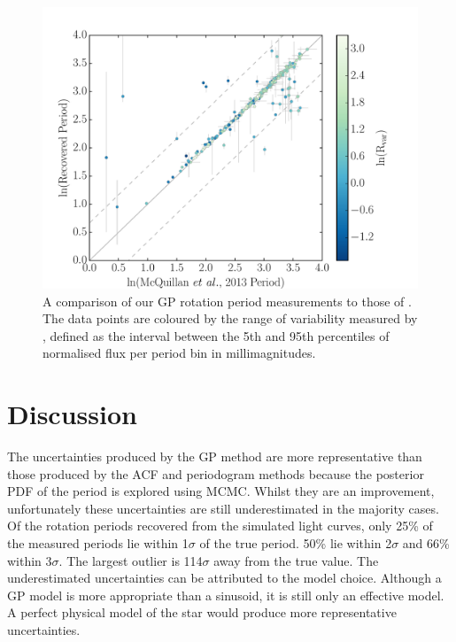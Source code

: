 \documentclass[useAMS, usenatbib, preprint, 12pt]{aastex}
\newcommand{\tdmcomment}[1]{{\color{blue}#1}}
\begin{document}
\begin{figure}
\begin{center}
\includegraphics[width=6in, clip=true]{figures/comparison_koi_02_03.pdf}
\caption[Comparison with McQuillan results.]
{A comparison of our GP rotation period measurements to those of
\citet{Mcquillan2013}.
The data points are coloured by the range of variability measured by
    \citet{Mcquillan2013}, defined as the interval between the 5th and 95th
    percentiles of normalised flux per period bin in millimagnitudes.}
\label{fig:mcquillan}
\end{center}
\end{figure}

\section{Discussion}
\label{sec:discussion}

The uncertainties produced by the GP method are more representative than those
produced by the ACF and periodogram methods because the posterior PDF of the
period is explored using MCMC.
Whilst they are an improvement, unfortunately these uncertainties are still
underestimated in the majority cases.
Of the rotation periods recovered from the simulated light curves, only 25\%
of the measured periods lie within 1$\sigma$ of the true period.
50\% lie within 2$\sigma$ and 66\% within 3$\sigma$.
The largest outlier is 114$\sigma$ away from the true value.
The underestimated uncertainties can be attributed to the model choice.
Although a GP model is more appropriate than a sinusoid, it is still only an
 effective model.
A perfect physical model of the star would produce more representative
uncertainties.
\end{document}
